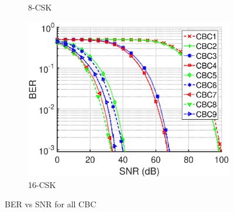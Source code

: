\documentclass[10pt,letterpaper]{article}
\begin{document}
\begin{figure}[t]
\begin{subfigure}{0.49\textwidth}
			\caption{8-CSK}
			\label{fig8SNR_NL}
		\end{subfigure}
		\vfill
		\begin{subfigure}{0.49\textwidth}
		\centering
			\includegraphics[trim={0.1in 0.0in 0.5in 0.3in}, clip=true, width=\textwidth]{M16_16-CSK_BERvsSNR_NL.eps}
			\caption{16-CSK}
			\label{fig16SNR_NL}
		\end{subfigure}
	\caption{BER vs SNR for all CBC}
	\label{figBERvsSNR_NL}
\end{figure}
\end{document}
